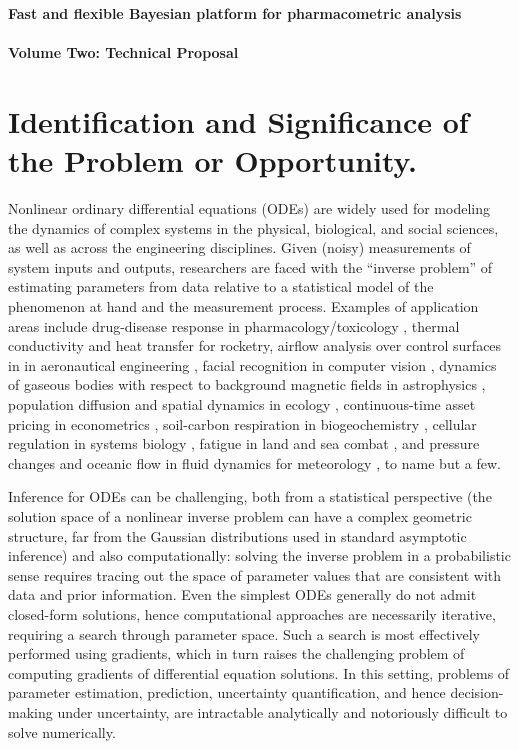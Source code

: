\documentclass[11pt]{nih2016}
\begin{document}
\begin{center}
\Large\bf Fast and flexible Bayesian platform for pharmacometric
analysis \\
\ \\
Volume Two: Technical Proposal
\end{center}

\section{Identification and Significance of the Problem or Opportunity.}


Nonlinear ordinary differential equations (ODEs) are widely used for modeling
the dynamics of complex systems in the physical, biological, and
social sciences, as well as across the engineering disciplines. Given
(noisy) measurements of system inputs and outputs, researchers are
faced with the ``inverse problem'' of estimating parameters from data
relative to a statistical model of the phenomenon at hand and the
measurement process.  Examples of application areas include
drug-disease response in pharmacology/toxicology
\cite{peterson-rigg:2010, gelman-et-al:1996}, thermal conductivity and
heat transfer for rocketry, airflow analysis over control surfaces in
in aeronautical engineering \cite{alifanov:2012}, facial recognition
in computer vision \cite{aubert-kornprobst:2006, bovik:2010}, dynamics
of gaseous bodies with respect to background magnetic fields in
astrophysics \cite{tobias-et-al:2011}, population diffusion and
spatial dynamics in ecology \cite{gopalsamy:2013}, continuous-time
asset pricing in econometrics \cite{johannes-polson:2010}, soil-carbon
respiration in biogeochemistry \cite{manzoni-porporato:2009}, cellular
regulation in systems biology \cite{baron-gastonguay:2015,
  baron-et-al:2013, leclerc-et-al:2016}, fatigue in land and sea
combat \cite{rubio-campillo:2016}, and pressure changes and oceanic
flow in fluid dynamics for meteorology \cite{charney-phillips:1953},
to name but a few.

Inference for ODEs can be challenging, both from a statistical
perspective (the solution space of a nonlinear inverse problem can
have a complex geometric structure, far from the Gaussian
distributions used in standard asymptotic inference) and also
computationally: solving the inverse problem in a probabilistic sense
requires tracing out the space of parameter values that are consistent
with data and prior information.  Even the simplest ODEs generally do
not admit closed-form solutions, hence computational approaches are
necessarily iterative, requiring a search through parameter space.
Such a search is most effectively performed using gradients, which in
turn raises the challenging problem of computing gradients of
differential equation solutions. In this setting, problems of
parameter estimation, prediction, uncertainty quantification, and
hence decision-making under uncertainty, are intractable analytically
and notoriously difficult to solve numerically.
\end{document}
